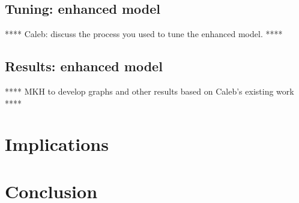 \documentclass[letterpaper,12pt]{article}
\begin{document}
\subsection{Tuning: enhanced model}
\label{sec:Tuning_enhanced_model}

**** Caleb: discuss the process you used to tune the enhanced model. ****

\subsection{Results: enhanced model}
\label{sec:Results_enhanced_model}

**** MKH to develop graphs and other results based on Caleb's existing work ****


\section{Implications}
\label{sec:Implications}

\section{Conclusion}
\label{sec:Conclustion}




\end{document}

